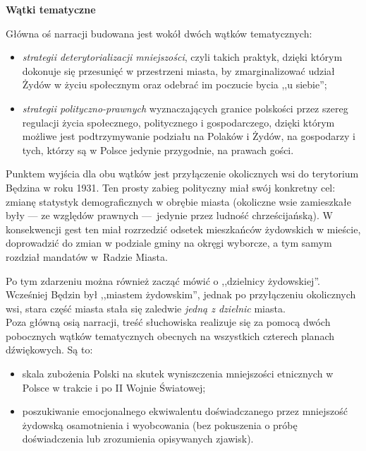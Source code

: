 \documentclass[11pt,a4paper,oneside]{article}
\begin{document}
\vspace{0.5cm}

\textbf{Wątki tematyczne}

Główna oś narracji budowana jest wokół dwóch wątków tematycznych:

\begin{itemize}
\item
  \emph{strategii deterytorializacji mniejszości}, czyli takich praktyk,
    dzięki którym dokonuje się przesunięć w przestrzeni miasta, by
    zmarginalizować udział Żydów w życiu społecznym oraz odebrać im poczucie
    bycia ,,u siebie'';
\item
  \emph{strategii polityczno-prawnych} wyznaczających granice polskości
  przez szereg regulacji życia społecznego, politycznego i gospodarczego,
  dzięki którym możliwe jest podtrzymywanie podziału na Polaków i Żydów,
  na gospodarzy i tych, którzy są w Polsce jedynie przygodnie, na prawach gości.
\end{itemize}

Punktem wyjścia dla obu wątków jest przyłączenie okolicznych wsi do terytorium
Będzina w roku 1931. Ten prosty zabieg polityczny miał swój konkretny cel:
zmianę statystyk demograficznych w obrębie miasta (okoliczne wsie zamieszkałe
były --- ze względów prawnych ---~jedynie przez ludność chrześcijańską).
W konsekwencji gest ten miał rozrzedzić odsetek mieszkańców żydowskich
w mieście, doprowadzić do zmian w podziale gminy na okręgi wyborcze, a tym
samym rozdział mandatów w~Radzie Miasta. 

\hspace{1em}Po tym zdarzeniu można również zacząć
mówić o ,,dzielnicy żydowskiej''. Wcześniej Będzin był ,,miastem żydowskim'',
jednak po przyłączeniu okolicznych wsi, stara część miasta stała się zaledwie
\emph{jedną z dzielnic} miasta. 
\\

Poza główną osią narracji, treść słuchowiska realizuje się za pomocą dwóch
pobocznych wątków tematycznych obecnych na wszystkich czterech planach
dźwiękowych. Są to: 
\begin{itemize}
\item
    skala zubożenia Polski na skutek wyniszczenia mniejszości etnicznych
    w Polsce w trakcie i po II Wojnie Światowej; 
\item
    poszukiwanie emocjonalnego ekwiwalentu doświadczanego przez mniejszość
    żydowską osamotnienia i wyobcowania (bez pokuszenia o próbę doświadczenia
    lub zrozumienia opisywanych zjawisk).  
\end{itemize}
\end{document}
